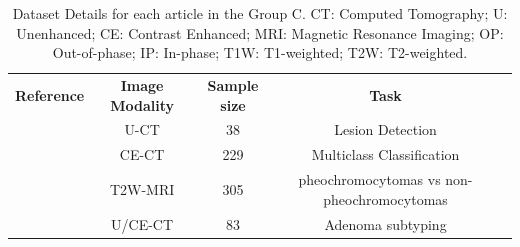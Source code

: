 \documentclass{article}
\begin{document}
\begin{table}[]
    \centering
    \begin{tabular}{ccccc}\toprule
        \multirow{2}{*}{\textbf{Reference}} & \multirow{2}{*}{\textbf{Image Modality}} & \multirow{2}{*}{\textbf{Sample size}} & \multirow{2}{*}{\textbf{Task}}             \\
        \\ \midrule
        \cite{Bi2017}                       & U-CT                                     & 38                                    & Lesion Detection                           \\
        \cite{Bi2022}                       & CE-CT                                    & 229                                   & Multiclass Classification                  \\
        \cite{Kong2022}                     & T2W-MRI                                  & 305                                   & pheochromocytomas vs non-pheochromocytomas \\
        \cite{Zheng2020}                    & U/CE-CT                                  & 83                                    & Adenoma subtyping                          \\
        \bottomrule
    \end{tabular}
    \caption{Dataset Details for each article in the Group C. CT: Computed Tomography; U: Unenhanced; CE: Contrast Enhanced; MRI: Magnetic Resonance Imaging; OP: Out-of-phase; IP: In-phase; T1W: T1-weighted; T2W: T2-weighted.}
    \label{tab:data_C}
\end{table}
\end{document}
